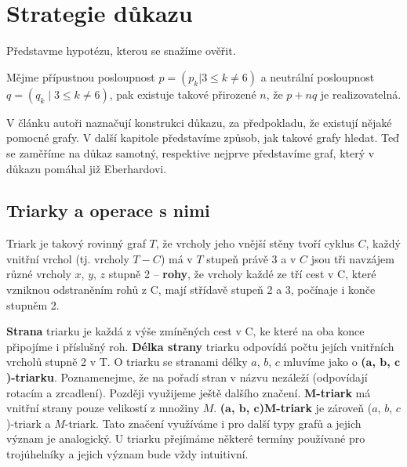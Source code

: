 
\chapter{Strategie důkazu}

Představme hypotézu, kterou se snažíme ověřit.
\begin{hypot}\label{veta02:hypoteza}
Mějme přípustnou posloupnost $p=(p_k | 3 \leq k \neq 6)$ a neutrální posloupnost $q=(q_k \mid 3 \leq k \neq 6)$, pak existuje takové přirozené $n$, že $p+nq$ je realizovatelná.
\end{hypot}


V článku \citep{Samal09} autoři naznačují konstrukci důkazu, za předpokladu, že existují nějaké pomocné grafy. V další kapitole představíme způsob, jak takové grafy hledat. Teď se zaměříme na důkaz samotný, respektive nejprve představíme graf, který v důkazu pomáhal již Eberhardovi.

\section{Triarky a operace s nimi}

\begin{definice}[Triark]\label{def02:1}
Triark je takový rovinný graf $T$, že vrcholy jeho vnější stěny tvoří cyklus $C$, každý vnitřní vrchol (tj. vrcholy $T-C$) má v $T$ stupeň právě 3 a v $C$ jsou tři navzájem různé vrcholy $x$, $y$, $z$ stupně 2 -- \textbf{rohy}, že vrcholy každé ze tří cest v C, které vzniknou odstraněním rohů z C, mají střídavě stupeň 2 a 3, počínaje i konče stupněm 2.
\end{definice}

\textbf{Strana} triarku je každá z výše zmíněných cest v C, ke které na oba konce připojíme i příslušný roh. \textbf{Délka strany} triarku odpovídá počtu jejích vnitřních vrcholů stupně 2 v T. O triarku se stranami délky $a$, $b$, $c$ mluvíme jako o \textbf{($\boldsymbol{a}$, $\boldsymbol{b}$, $\boldsymbol{c}$)-triarku}. Poznamenejme, že na pořadí stran v názvu nezáleží (odpovídají rotacím a zrcadlení). Později využijeme ještě dalšího značení. \textbf{$\boldsymbol{M}$-triark} má vnitřní strany pouze velikostí z množiny $M$. \textbf{($\boldsymbol{a}$, $\boldsymbol{b}$, $\boldsymbol{c}$)$\boldsymbol{M}$-triark} je zároveň ($a$, $b$, $c$)-triark a $M$-triark. Tato značení využíváme i pro další typy grafů a jejich význam je analogický. U triarku přejímáme některé termíny používané pro trojúhelníky a jejich význam bude vždy intuitivní.

